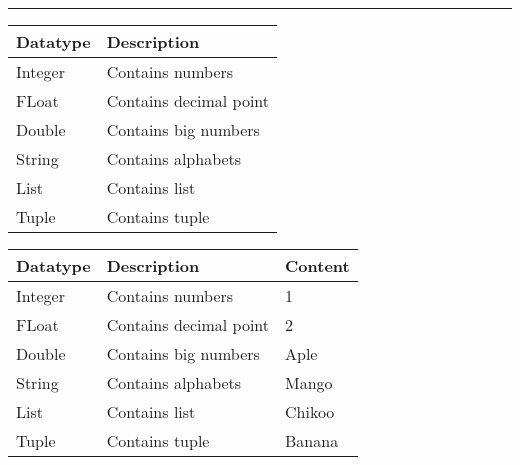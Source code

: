\par\noindent\rule{\textwidth}{0.2pt}

\begin{tabulary}{1.0\textwidth}{|p{12em}|p{12em}|}
	\toprule
	\textbf{Datatype} & \textbf{Description} \\
	\midrule
	Integer & Contains numbers \\
	\hline
	FLoat & Contains decimal point \\
	\hline
	Double & Contains big numbers \\
	\hline
	String & Contains alphabets \\
	\hline
	List & Contains list \\
	\hline
	Tuple & Contains tuple \\
	\bottomrule
\end{tabulary}



\begin{tabulary}{1.0\textwidth}{|p{6em}|p{12em}|p{6em}|}
	\toprule
	\textbf{Datatype} & \textbf{Description} & \textbf{Content} \\
	\midrule
	Integer & Contains numbers & 1 \\
	\hline
	FLoat & Contains decimal point & 2 \\
	\hline
	Double & Contains big numbers & Aple \\
	\hline
	String & Contains alphabets & Mango \\
	\hline
	List & Contains list & Chikoo \\
	\hline
	Tuple & Contains tuple & Banana \\
	\bottomrule
\end{tabulary}
